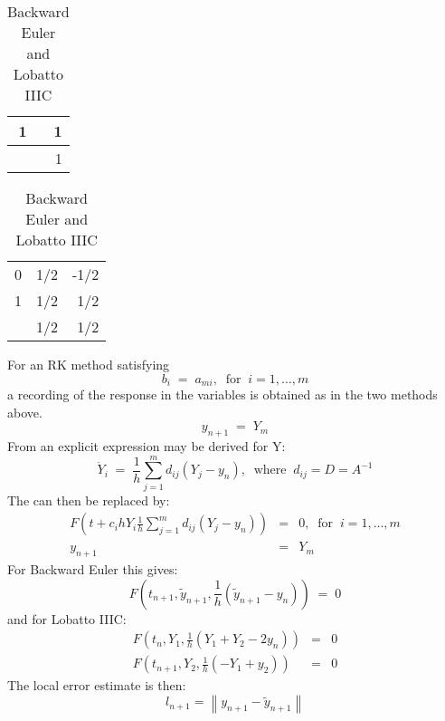 \begin{table}
\begin{center}
\begin{tabular}{c|r}
1 & 1 \\ \hline
  & 1 \\
\end{tabular} \hskip1.5cm
\begin{tabular}{c|rr}
0 & 1/2 & -1/2 \\
1 & 1/2 &  1/2 \\ \hline
  & 1/2 &  1/2 \\
\end{tabular}
\end{center}
\caption{Backward Euler and Lobatto IIIC}
\label{tabC:92}
\end{table}
%
For an RK method satisfying
%
\begin{equation}
b_i \;=\; a_{mi},\;\;\mbox{for}\;\; i=1,\dots,m
\label{eqC:99}
\end{equation}
%
a recording of the response in the variables is obtained as in the two methods above.
%
\begin{equation}
y_{n+1} \;=\; Y_m
\label{eqC:910}
\end{equation}
%
From  an explicit expression may be derived for Y:
%
\begin{equation}
\dot{Y}_i \;=\;
\frac{1}{h}\sum_{j=1}^m d_{ij} \left(Y_j - y_n \right),
\;\;\mbox{where}\;\;
d_{ij} = D = A^{-1}
\label{eqC:911}
\end{equation}
%
The  can then be replaced by:
%
\begin{eqnarray}
F\left(t + c_i h Y_i \frac{1}{h}\sum_{j=1}^m d_{ij}
\left(Y_j-y_n\right)\right) &=& 0,
\;\;\mbox{for}\;\; i = 1,\dots,m \\
\label{eqC:912}
y_{n+1} &=& Y_m
\label{eqC:913}
\end{eqnarray}
%
For Backward Euler this gives:
%
\begin{equation}
F\left(t_{n+1}, \tilde{y}_{n+1} ,\frac{1}{h}\left(
\tilde{y}_{n+1} - y_n\right)\right) \;=\; 0
\label{eqC:914}
\end{equation}
%
and for Lobatto IIIC:
%
\begin{eqnarray}
F\left(t_n,Y_1, \frac{1}{h}\left(Y_1 + Y_2 - 2y_n \right)\right) &=& 0
\label{eqC:915} \\
%
F\left(t_{n+1}, Y_2 ,\frac{1}{h}\left(-Y_1 + y_2 \right)\right) &=& 0
\label{eqC:916}
\end{eqnarray}
%
The local error estimate is then:
%
\begin{equation}
l_{n+1} = \left\| y_{n+1} - \tilde{y}_{n+1}\right\|
\label{eqC:918}
\end{equation}
